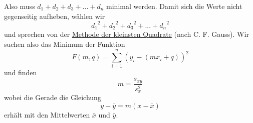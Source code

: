 \documentclass{report}
\begin{document}
Also muss $d_1 + d_2 + d_3 + ... + d_n$ minimal werden. Damit sich die Werte nicht gegenseitig aufheben, wählen wir
\begin{equation}
{d_1}^2 + {d_2}^2 + {d_3}^2 + ... + {d_n}^2
\end{equation}
und sprechen von der \underline{Methode der kleinsten Quadrate} (nach C. F. Gauss). Wir suchen also das Minimum der Funktion
\begin{equation}
F(m,q) = \sum_{i=1}^{n}{(y_i - (mx_i + q))^2}
\end{equation}
und finden
\begin{equation}
m = \frac{s_{xy}}{s_x^2}
\end{equation}
wobei die Gerade die Gleichung
\begin{equation}
y - \bar{y} = m (x-\bar{x})
\end{equation}
erhält mit den Mittelwerten $\bar{x}$ und $\bar{y}$.
\end{document}
